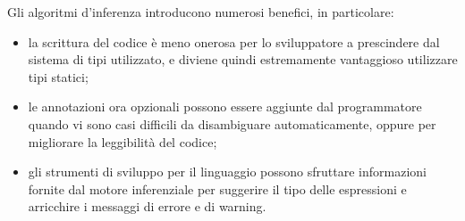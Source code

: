 \noindent Gli algoritmi d'inferenza introducono numerosi benefici, in particolare:
\begin{itemize}
      \item la scrittura del codice è meno onerosa per lo sviluppatore a prescindere dal sistema di tipi utilizzato,
            e diviene quindi estremamente vantaggioso utilizzare tipi statici;
      \item le annotazioni ora opzionali possono essere aggiunte dal programmatore quando vi sono casi difficili
            da disambiguare automaticamente, oppure per migliorare la leggibilità del codice;
      \item gli strumenti di sviluppo per il linguaggio possono sfruttare informazioni fornite dal motore inferenziale
            per suggerire il tipo delle espressioni e arricchire i messaggi di errore e di warning.
\end{itemize}

\newpage



